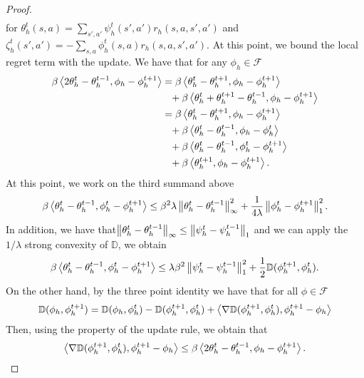 \begin{proof}
\begin{align*}
\end{align*}
for $\theta_h^t(s,a) = \sum_{s',a'} \psi_h^t(s',a') r_h(s,a,s',a')$ and $\zeta_h^t(s',a') = - \sum_{s,a} \phi_h^t(s,a) r_h(s,a,s',a')$.
At this point, we bound the local regret term with the \oomdmethod{}  update. We have that for any $\phi_h \in \mathcal{F}$
\begin{align*}
 \beta \left\langle{2 \theta_h^{t} - \theta_h^{t-1}},{\phi_h - \phi_h^{t+1}}\right\rangle &=  \beta \left\langle{ \theta_h^{t} - \theta_h^{t+1}},{\phi_h - \phi_h^{t+1}}\right\rangle \\&\phantom{=} +
 \beta \left\langle{ \theta_h^{t}+ \theta^{t+1}_h - \theta^{t-1}_h},{\phi_h - \phi_h^{t+1}}\right\rangle \\
&=  \beta \left\langle{ \theta^{t}_h - \theta^{t+1}_h},{\phi_h - \phi_h^{t+1}}\right\rangle \\
&\phantom{=}+  \beta \left\langle{ \theta^{t}_h - \theta^{t-1}_h},{\phi_h - \phi^t_h}\right\rangle \\
&\phantom{=}+  \beta \left\langle{ \theta_h^{t} - \theta_h^{t-1}},{\phi^t_h - \phi^{t+1}_h}\right\rangle \\
&\phantom{=}+ \beta \left\langle{ \theta^{t+1}_h},{\phi_h - \phi_h^{t+1}}\right\rangle.
\end{align*}
At this point, we work on the third summand above
\begin{align*}
 \beta \left\langle{ \theta^{t}_h - \theta^{t-1}_h},{\phi^t_h - \phi_h^{t+1}}\right\rangle \leq  \beta^2 \lambda \left\lVert\theta^t_h - \theta^{t-1}_h\right\rVert_{\infty}^2 + \frac{1}{4 \lambda}\left\lVert\phi^t_h - \phi_h^{t+1}\right\rVert_{1}^2.
\end{align*}
In addition, we have that$
\left\lVert\theta^t_h - \theta^{t-1}_h\right\rVert_{\infty} \leq \left\lVert\psi_h^{t} - \psi_h^{t-1}\right\rVert_1$
and we can apply the $1/\lambda$ strong convexity of $\mathbb{D}$, we obtain
\begin{align*}
 \beta \left\langle{ \theta_h^{t} - \theta_h^{t-1}},{\phi_h^t - \phi_h^{t+1}}\right\rangle \leq   \lambda \beta^2 \left\lVert\psi_h^{t} - \psi_h^{t-1}\right\rVert^2_1 + \frac{1}{2}\mathbb{D}(\phi_h^{t+1},\phi_h^t).
\end{align*}
On the other hand, by the three point identity we have that for all $\phi \in \mathcal{F}$
\begin{equation*}
\mathbb{D}(\phi_h,\phi_h^{t+1}) = \mathbb{D}(\phi_h,\phi_h^{t}) - \mathbb{D}(\phi_h^{t+1},\phi_h^{t}) + \left\langle{\nabla \mathbb{D}(\phi_h^{t+1}, \phi_h^t)},{\phi_h^{t+1} - \phi_h}\right\rangle
\end{equation*}
Then, using the property of the update rule, we obtain that 
\begin{equation*}
 \innerprod{\nabla \mathbb{D}(\phi_h^{t+1}, \phi_h^t)}{\phi_h^{t+1} - \phi_h} \leq  \beta \innerprod{2 \theta^{t}_h - \theta_h^{t-1}}{\phi_h - \phi_h^{t+1}}.

\end{equation*}
\end{proof}
